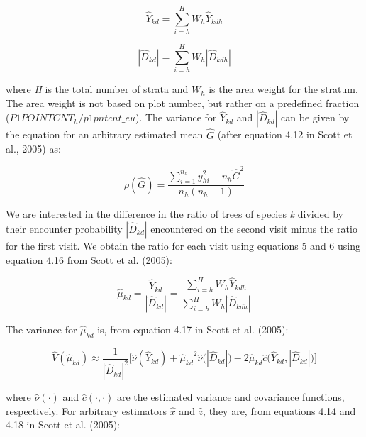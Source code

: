 \documentclass[12pt]{article}
\begin{document}
 \begin{equation} \label{eq:hatY}
\hat{Y}_{kd} = \displaystyle\sum_{i=h}^{H} W_h \hat{Y}_{kdh}
\end{equation} 

\begin{equation}  \label{eq:hatD}
|\hat{D}_{kd}| = \displaystyle\sum_{i=h}^{H} W_h |\hat{D}_{kdh}|
\end{equation} 

where \emph{H} is the total number of strata and $W_h$ is the area weight for the stratum. The area weight is not based on plot number, but rather on a predefined fraction ($P1POINTCNT_h / p1pntcnt\_eu$).  The variance for $\hat{Y}_{kd}$ and $|\hat{D}_{kd}|$ can be given by the equation for an arbitrary estimated mean $\hat{G}$ (after equation 4.12 in Scott et al., 2005) as:

\begin{equation}
\rho(\hat{G}) = \frac{\displaystyle\sum_{i=1}^{n_h}y^2_{hi} - n_h\hat{G}^2}{n_h(n_h - 1)}
\end{equation}



We are interested in the difference in the ratio of trees of species \emph{k} divided by their encounter probability $|\hat{D}_{kd}|$  encountered on the second visit minus the ratio for the first visit.  We obtain the ratio for each visit using equations 5 and 6 using equation 4.16 from Scott et al. (2005):


 \begin{equation}  \label{eq:hatMu}
\hat{\mu}_{kd} = \frac{\hat{Y}_{kd}}{|\hat{D}_{kd}|} = \frac{\displaystyle\sum_{i=h}^{H} W_h \hat{Y}_{kdh}}{ \displaystyle\sum_{i=h}^{H} W_h |\hat{D}_{kdh}|}
\end{equation}
 
The variance for $\hat{\mu}_{kd}$ is, from equation 4.17 in Scott et al. (2005):


 \begin{equation}
\hat{V}(\hat{\mu}_{kd}) \approx \frac{1}{{|\hat{D}_{kd}|}^2} \Big[ \hat{\nu}(\hat{Y}_{kd}) + {\hat{\mu}_{kd}}^2 \hat{\nu} \big( |\hat{D}_{kd}| \big) - 
2\hat{\mu}_{kd}\hat{c}\big(\hat{Y}_{kd},  |\hat{D}_{kd}| \big) \Big]
\end{equation}

where $\hat{\nu}(\cdot)$ and $\hat{c}(\cdot, \cdot)$ are the estimated variance and covariance functions, respectively.  For arbitrary estimators $\hat{x}$ and $\hat{z}$, they are, from equations 4.14 and 4.18 in Scott et al. (2005):
\end{document}
